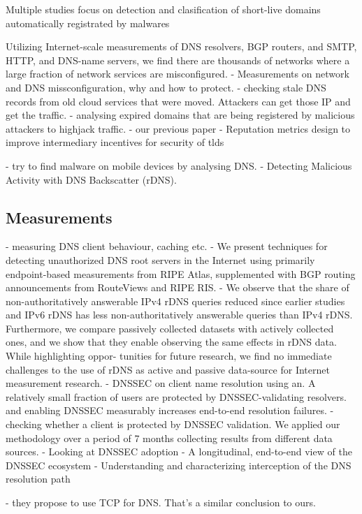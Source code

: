 Multiple studies focus on detection and clasification of  short-live domains automatically registrated by malwares \cite{vissers2017exploring,kountouras2016enabling,pereira2018dictionary,alrwais2014understanding,plohmann2016comprehensive,schuppen2018fanci}


\cite{zhang2014mismanagement} Utilizing Internet-scale measurements of DNS resolvers, BGP routers, and SMTP, HTTP, and DNS-name servers, we find there are thousands of networks where a large fraction of network services are misconfigured. 
\cite{dietrich2018investigating} - Measurements on network and DNS missconfiguration, why and how to protect.
\cite{borgolte2018cloud} - checking stale DNS records from old cloud services that were moved. Attackers can get those IP and get the traffic. 
\cite{lever2016domain} - analysing expired domains that are being registered by malicious attackers to highjack traffic. 
\cite{korczynski2016zone} - our previous paper
\cite{korczynski2017reputation} - Reputation metrics design to improve intermediary incentives for security of tlds



\cite{lever2013core} - try to find malware on mobile devices by analysing DNS. 
\cite{fukuda2015detecting} - Detecting Malicious Activity with DNS Backscatter (rDNS).





\subsection{Measurements}
\cite{schomp2013measuring} - measuring DNS client behaviour, caching etc. 
\cite{jones2016detecting} - We present techniques for detecting unauthorized DNS root servers in the Internet using primarily endpoint-based measurements from RIPE Atlas, supplemented with BGP routing announcements from RouteViews and RIPE RIS. 
\cite{fiebig2018rdns} - We observe that the share of non-authoritatively answerable IPv4 rDNS queries reduced since earlier studies and IPv6 rDNS has less non-authoritatively answerable queries than IPv4 rDNS. Furthermore, we compare passively collected datasets with actively collected ones, and we show that they enable observing the same effects in rDNS data. While highlighting oppor- tunities for future research, we find no immediate challenges to the use of rDNS as active and passive data-source for Internet measurement research.
\cite{lian2013measuring} - DNSSEC on client name resolution using an. A relatively small fraction of users are protected by DNSSEC-validating resolvers. and enabling DNSSEC measurably increases end-to-end resolution failures.
\cite{wander2013measuring} - checking whether a client is protected by DNSSEC validation. We applied our methodology over a period of 7 months collecting results from different data sources. 
\cite{chung2017understanding} - Looking at DNSSEC adoption
\cite{chung2017longitudinal} - A longitudinal, end-to-end view of the DNSSEC ecosystem
\cite{liu2018answering} - Understanding and characterizing interception of the DNS resolution path



\cite{zhu2015connection} - they propose to use TCP for DNS. That's a similar conclusion to ours. 






